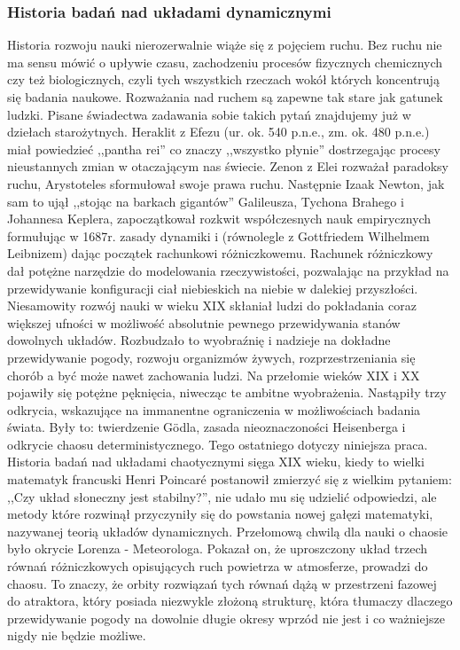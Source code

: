 \documentclass[licencjacka]{pwr_wmat_praca_dyplomowa}
\theoremstyle{plain}
\numberwithin{theorem}{chapter}
\theoremstyle{definition}
\numberwithin{theorem}{chapter}
\begin{document}
\subsubsection{Historia badań nad układami dynamicznymi}
Historia rozwoju nauki nierozerwalnie wiąże się z pojęciem ruchu. Bez ruchu nie ma sensu mówić o upływie czasu, zachodzeniu procesów fizycznych chemicznych czy też biologicznych, czyli tych wszystkich rzeczach wokół których koncentrują się badania naukowe. Rozważania nad ruchem są zapewne tak stare jak gatunek ludzki. Pisane świadectwa zadawania sobie takich pytań znajdujemy już w dziełach starożytnych. Heraklit z Efezu (ur. ok. 540 p.n.e., zm. ok. 480 p.n.e.) miał powiedzieć ,,pantha rei'' co znaczy ,,wszystko płynie'' dostrzegając procesy nieustannych zmian w otaczającym nas świecie. Zenon z Elei rozważał paradoksy ruchu, Arystoteles sformułował swoje prawa ruchu. Następnie Izaak Newton, jak sam to ujął ,,stojąc na barkach gigantów'' Galileusza, Tychona Brahego i Johannesa Keplera, zapoczątkował rozkwit współczesnych nauk empirycznych formułując w 1687r. zasady dynamiki i (równolegle z Gottfriedem Wilhelmem Leibnizem) dając początek rachunkowi różniczkowemu. Rachunek różniczkowy dał potężne narzędzie do modelowania rzeczywistości, pozwalając na przykład na przewidywanie konfiguracji ciał niebieskich na niebie w dalekiej przyszłości. Niesamowity rozwój nauki w wieku XIX skłaniał ludzi do pokładania coraz większej ufności w możliwość absolutnie pewnego przewidywania stanów dowolnych układów. Rozbudzało to wyobraźnię i nadzieje na dokładne przewidywanie pogody, rozwoju organizmów żywych, rozprzestrzeniania się chorób a być może nawet zachowania ludzi. Na przełomie wieków XIX i XX pojawiły się potężne pęknięcia, niwecząc te ambitne wyobrażenia. Nastąpiły trzy odkrycia, wskazujące na immanentne ograniczenia w możliwościach badania świata. Były to: twierdzenie G\"odla, zasada nieoznaczoności Heisenberga i odkrycie chaosu deterministycznego. Tego ostatniego dotyczy niniejsza praca. Historia badań nad układami chaotycznymi sięga XIX wieku, kiedy to wielki matematyk francuski Henri Poincar\'e postanowił zmierzyć się z wielkim pytaniem: ,,Czy układ słoneczny jest stabilny?'', nie udało mu się udzielić odpowiedzi, ale metody które rozwinął przyczyniły się do powstania nowej gałęzi matematyki, nazywanej teorią układów dynamicznych. Przełomową chwilą dla nauki o chaosie było okrycie Lorenza - Meteorologa. Pokazał on, że uproszczony układ trzech równań różniczkowych opisujących ruch powietrza w atmosferze, prowadzi do chaosu. To znaczy, że orbity rozwiązań tych równań dążą w przestrzeni fazowej do atraktora, który posiada niezwykle złożoną strukturę, która tłumaczy dlaczego przewidywanie pogody na dowolnie długie okresy wprzód nie jest i co ważniejsze nigdy nie będzie możliwe.
\end{document}

